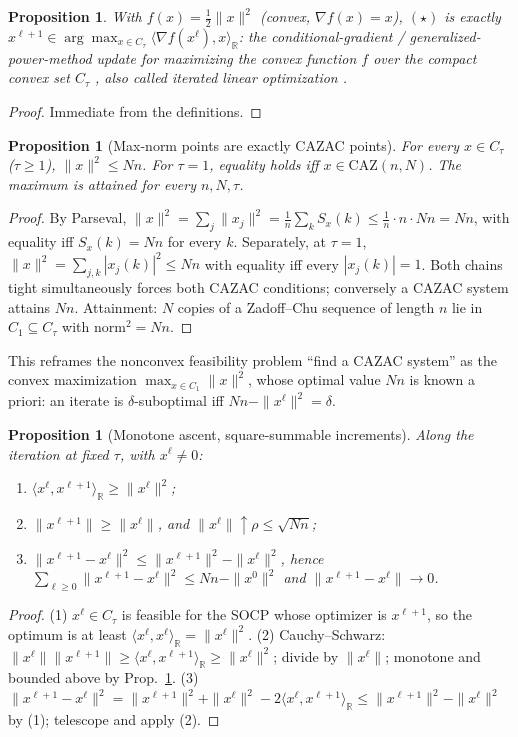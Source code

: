 \documentclass[11pt]{article}
\theoremstyle{plain}
\newtheorem{proposition}[theorem]{Proposition}
\theoremstyle{definition}
\theoremstyle{remark}
\newcommand{\R}{\mathbb R}
\newcommand{\CAZ}{\mathrm{CAZ}}
\begin{document}
\begin{proposition}\label{prop:1}
With $f(x)=\tfrac12\|x\|^2$ (convex, $\nabla f(x)=x$), $(\star)$ is exactly
$x^{\ell+1}\in\arg\max_{x\in C_\tau}\langle\nabla f(x^\ell),x\rangle_\R$: the
conditional-gradient / generalized-power-method update for maximizing the
convex function $f$ over the compact convex set $C_\tau$ \cite{JNRS10},
also called iterated linear optimization \cite{FKP21}.
\end{proposition}
\begin{proof}
Immediate from the definitions.
\end{proof}

\begin{proposition}[Max-norm points are exactly CAZAC points]\label{prop:2}
For every $x\in C_\tau$ ($\tau\ge1$), $\|x\|^2\le Nn$. For $\tau=1$,
equality holds iff $x\in\CAZ(n,N)$. The maximum is attained for every
$n,N,\tau$.
\end{proposition}
\begin{proof}
By Parseval, $\|x\|^2=\sum_j\|x_j\|^2=\tfrac1n\sum_k S_x(k)\le\tfrac1n\cdot n\cdot Nn=Nn$,
with equality iff $S_x(k)=Nn$ for every $k$. Separately, at $\tau=1$,
$\|x\|^2=\sum_{j,k}|x_j(k)|^2\le Nn$ with equality iff every $|x_j(k)|=1$.
Both chains tight simultaneously forces both CAZAC conditions; conversely a
CAZAC system attains $Nn$. Attainment: $N$ copies of a Zadoff--Chu sequence
of length $n$ lie in $C_1\subseteq C_\tau$ with norm$^2=Nn$.
\end{proof}

This reframes the nonconvex feasibility problem ``find a CAZAC system'' as
the convex maximization $\max_{x\in C_1}\|x\|^2$, whose optimal value $Nn$
is known a priori: an iterate is $\delta$-suboptimal iff $Nn-\|x^\ell\|^2=\delta$.

\begin{proposition}[Monotone ascent, square-summable increments]\label{prop:3}
Along the iteration at fixed $\tau$, with $x^\ell\ne0$:
\begin{enumerate}
\item[\rm(1)] $\langle x^\ell,x^{\ell+1}\rangle_\R\ge\|x^\ell\|^2$;
\item[\rm(2)] $\|x^{\ell+1}\|\ge\|x^\ell\|$, and $\|x^\ell\|\uparrow\rho\le\sqrt{Nn}$;
\item[\rm(3)] $\|x^{\ell+1}-x^\ell\|^2\le\|x^{\ell+1}\|^2-\|x^\ell\|^2$, hence
$\sum_{\ell\ge0}\|x^{\ell+1}-x^\ell\|^2\le Nn-\|x^0\|^2$ and
$\|x^{\ell+1}-x^\ell\|\to0$.
\end{enumerate}
\end{proposition}
\begin{proof}
(1) $x^\ell\in C_\tau$ is feasible for the SOCP whose optimizer is
$x^{\ell+1}$, so the optimum is at least $\langle x^\ell,x^\ell\rangle_\R=\|x^\ell\|^2$.
(2) Cauchy--Schwarz: $\|x^\ell\|\|x^{\ell+1}\|\ge\langle x^\ell,x^{\ell+1}\rangle_\R\ge\|x^\ell\|^2$;
divide by $\|x^\ell\|$; monotone and bounded above by Prop.~\ref{prop:2}.
(3) $\|x^{\ell+1}-x^\ell\|^2=\|x^{\ell+1}\|^2+\|x^\ell\|^2-2\langle x^\ell,x^{\ell+1}\rangle_\R\le\|x^{\ell+1}\|^2-\|x^\ell\|^2$
by (1); telescope and apply (2).
\end{proof}
\end{document}
